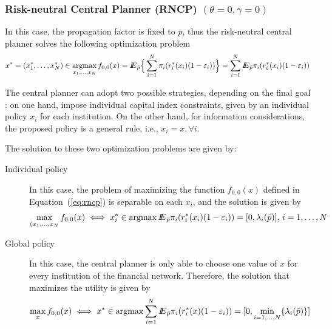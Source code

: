 \subsubsection{Risk-neutral Central Planner (RNCP) $(\theta=0,\gamma=0)$}
In this case, the propagation factor is fixed to $\bar p$, thus the risk-neutral central planner solves the following optimization problem
\begin{equation}\label{eq:rncp}
x^*=(x_1^*,\ldots,x_N^*)\in\mathop{\rm argmax}_{x_1,\ldots,x_N} f_{0,0}(x)={I\kern-.35em E}_{\bar p}\Big\lbrace\sum_{i=1}^N \pi_i(r_i^*(x_i)(1-\varepsilon_i))\Big\rbrace = \sum_{i=1}^N {I\kern-.35em E}_{\bar p} \pi_i(r_i^*(x_i)(1-\varepsilon_i))
\end{equation}

The central planner can adopt two possible strategies, depending on the final goal : on one hand, impose individual capital index constraints, given by an individual policy $x_i$ for each institution. On the other hand, for information considerations, the proposed policy is a general rule, i.e., $x_i=x,\forall i$.

The solution to these two optimization problems are given by:
\begin{description}
\item[Individual policy] In this case, the problem of maximizing the function $f_{0,0}(x)$ defined in Equation~(\ref{eq:rncp}) is separable on each $x_i$, and the solution is given by
\begin{equation}\label{eq:solrncpi}
\max_{(x_1,\ldots,x_N} f_{0,0}(x)\iff x_i^*\in\mathop{\rm argmax} {I\kern-.35em E}_{\bar{p}}\pi_i(r^*_i(x_i)(1-\varepsilon_i))=[0,\lambda_i(\bar{p})],\,i=1,\ldots,N
\end{equation}

\item[Global policy] In this case, the central planner is only able to choose one value of $x$ for every institution of the financial network.  Therefore, the solution that maximizes the utility is given by
\begin{equation}\label{eq:solrncpu}
\max_{x} f_{0,0}(x)\iff x^*\in\mathop{\rm argmax} \sum_{i=1}^N {I\kern-.35em E}_{\bar{p}}\pi_i(r^*_i(x)(1-\varepsilon_i))=[0,\min_{i=1,\ldots,N}\{\lambda_i(\bar{p})\}]
\end{equation}
\end{description}


